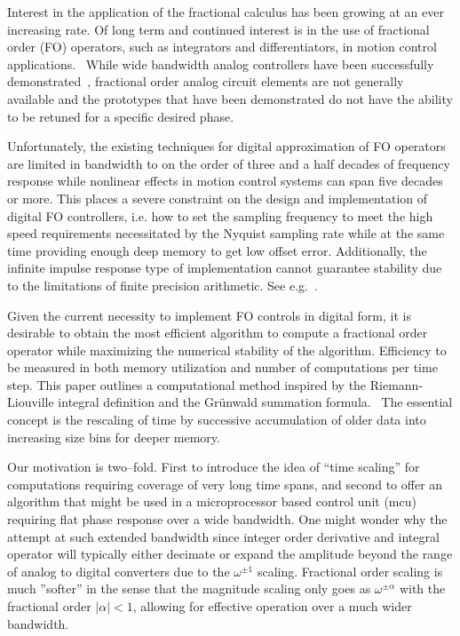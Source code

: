 
Interest in the application of the fractional calculus has been
growing at an ever increasing rate. Of long term and continued
interest is in the use of fractional order (FO) operators, such as
integrators and differentiators, in motion control
applications.~\cite{Luo:13} While wide bandwidth analog controllers
have been successfully demonstrated~\cite{Bohannan:08}, fractional
order analog circuit elements are not generally available and the
prototypes that have been demonstrated do not have the ability to be
retuned for a specific desired phase.~\cite{Monje:10}

Unfortunately, the existing techniques for digital approximation of FO
operators are limited in bandwidth to on the order of three and a half
decades of frequency response while nonlinear effects in motion
control systems can span five decades or more. This places a severe
constraint on the design and implementation of digital FO controllers,
i.e. how to set the sampling frequency to meet the high speed
requirements necessitated by the Nyquist sampling rate while at the
same time providing enough deep memory to get low offset
error. Additionally, the infinite impulse response type of
implementation cannot guarantee stability due to the limitations of
finite precision arithmetic. See e.g.~\cite{Chen:04a}.

Given the current necessity to implement FO controls in digital form,
it is desirable to obtain the most efficient algorithm to compute a
fractional order operator while maximizing the numerical stability of
the algorithm. Efficiency to be measured in both memory utilization
and number of computations per time step. This paper outlines a
computational method inspired by the Riemann-Liouville integral
definition and the Gr{\"u}nwald summation formula.~\cite{OldSpan:74} 
The essential concept is the rescaling of time by successive accumulation
of older data into increasing size bins for deeper memory.

Our motivation is two--fold. First to introduce the idea of ``time scaling'' 
for computations requiring coverage of very long time spans, and 
second to offer an algorithm that might be used in a microprocessor
based control unit (mcu) requiring flat phase response over a 
wide bandwidth. One might wonder why the attempt at such extended
bandwidth since integer order derivative and integral operator will typically
either decimate or expand the amplitude beyond the range of analog
to digital converters due to the $\omega^{\pm 1}$ scaling. 
Fractional order scaling is much ''softer'' in the sense that the magnitude
scaling only goes as $\omega^{\pm \alpha}$ with the fractional order 
$|\alpha | < 1$, allowing for effective operation over a much wider bandwidth.
